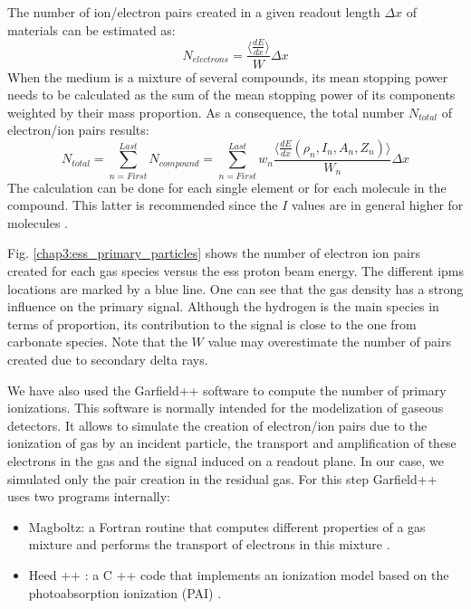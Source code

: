 \begin{refsection}
  The number of ion/electron pairs created in a given readout length $\Delta x$ of materials \cite{Weiss1955,Bichsel1979} can be estimated as:
  \begin{equation}
    N_{electrons}= \frac{\big \langle \frac{dE}{dx} \big \rangle}{W} \Delta x
  \end{equation}
  When the medium is a mixture of several compounds, its mean stopping power needs to be calculated as the sum of the mean stopping power of its components weighted by their mass proportion. As a consequence, the total number $N_{total}$ of electron/ion pairs results:
  \begin{equation}
    N_{total}= \sum_{n= First}^{Last} N_{compound}= \sum_{n= First}^{Last} w_{n} \frac{\big \langle \frac{dE}{dx}\left(\rho_{n},I_{n},A_{n},Z_{n}\right) \big \rangle}{W_{n}} \Delta x
  \end{equation}
  The calculation can be done for each single element or for each molecule in the compound. This latter is recommended since the \(I\) values are in general higher for molecules \cite[p. 451]{Tanabashi2018}.

  Fig. \ref{chap3:ess_primary_particles} shows the number of electron ion pairs created for each gas species versus the \acrshort{ess} proton beam energy. The different \acrshort{ipm}s locations are marked by a blue line. One can see that the gas density has a strong influence on the primary signal. Although the hydrogen is the main species in terms of proportion, its contribution to the signal is close to the one from carbonate species. Note that the \(W\) value may overestimate the number of pairs created due to secondary delta rays.
  

  We have also used the Garfield++ software to compute the number of primary ionizations. This software is normally intended for the modelization of gaseous detectors. It allows to simulate the creation of electron/ion pairs due to the ionization of gas by an incident particle, the transport and amplification of these electrons in the gas and the signal induced on a readout plane. In our case, we simulated only the pair creation in the residual gas. For this step Garfield++ uses two programs internally:
  \begin{itemize}
    \item Magboltz: a Fortran routine that computes different properties of a gas mixture and performs the transport of electrons in this mixture \cite{Biagi1989}.
    \item Heed ++ \cite{Smirnov2005}: a C ++ code that implements an ionization model based on the photoabsorption ionization (PAI) \cite{Allison1980}.
  \end{itemize}


\end{refsection}
